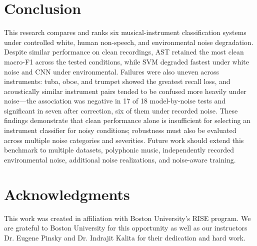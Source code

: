 \documentclass[conference]{IEEEtran}
\begin{document}
\section{Conclusion}
This research compares and ranks six musical-instrument classification systems under controlled white, human non-speech, and environmental noise degradation. Despite similar performance on clean recordings, AST retained the most clean macro-F1 across the tested conditions, while SVM degraded fastest under white noise and CNN under environmental. Failures were also uneven across instruments: tuba, oboe, and trumpet showed the greatest recall loss, and acoustically similar instrument pairs tended to be confused more heavily under noise---the association was negative in 17 of 18 model-by-noise tests and significant in seven after correction, six of them under recorded noise. These findings demonstrate that clean performance alone is insufficient for selecting an instrument classifier for noisy conditions; robustness must also be evaluated across multiple noise categories and severities. Future work should extend this benchmark to multiple datasets, polyphonic music, independently recorded environmental noise, additional noise realizations, and noise-aware training.

\section*{Acknowledgments}
This work was created in affiliation with Boston University's RISE program. We are grateful to Boston University for this opportunity as well as our instructors Dr. Eugene Pinsky and Dr. Indrajit Kalita for their dedication and hard work.
\end{document}
